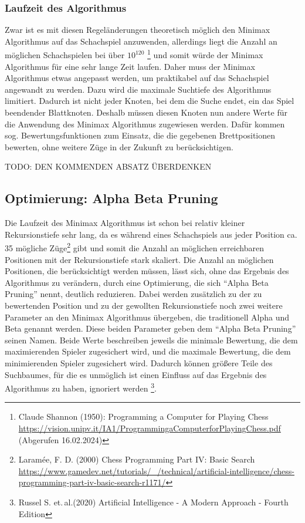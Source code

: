 \documentclass[12pt, a4paper, oneside, openright]{article}
\newcommand \sog{sog.\xspace }
\newcommand \ca{ca.\xspace }
\newcommand \etal{et.\,al.\xspace }
\begin{document}
\subsubsection{Laufzeit des Algorithmus}
Zwar ist es mit diesen Regeländerungen theoretisch möglich den Minimax Algorithmus auf das Schachspiel anzuwenden, allerdings liegt die Anzahl an möglichen Schachspielen bei  über $ 10^{120} $ \footnote{Claude Shannon (1950): Programming a Computer for Playing Chess \url{https://vision.unipv.it/IA1/ProgrammingaComputerforPlayingChess.pdf} (Abgerufen 16.02.2024)} und somit würde der Minimax Algorithmus für eine sehr lange Zeit laufen.
Daher muss der Minimax Algorithmus etwas angepasst werden, um praktikabel auf das Schachspiel angewandt zu werden.
Dazu wird die maximale Suchtiefe des Algorithmus limitiert.
Dadurch ist nicht jeder Knoten, bei dem die Suche endet, ein das Spiel beendender Blattknoten.
Deshalb müssen diesen Knoten nun andere Werte für die Anwendung des Minimax Algorithmus zugewiesen werden.
Dafür kommen \sog Bewertungsfunktionen zum Einsatz, die die gegebenen Brettpositionen bewerten, ohne weitere Züge in der Zukunft zu berücksichtigen\footnotemark[3].

TODO: DEN KOMMENDEN ABSATZ ÜBERDENKEN
\subsection{Optimierung: Alpha Beta Pruning}\label{subsec:optimierung:-alpha-beta-pruning}
Die Laufzeit des Minimax Algorithmus ist schon bei relativ kleiner Rekursionstiefe sehr lang, da es während eines Schachspiels aus jeder Position \ca 35 mögliche Züge\footnote{Laramée, F. D. (2000)  Chess Programming Part IV: Basic Search \url{https://www.gamedev.net/tutorials/_/technical/artificial-intelligence/chess-programming-part-iv-basic-search-r1171/}} gibt und somit die Anzahl an möglichen erreichbaren Positionen mit der Rekursionstiefe stark skaliert.
Die Anzahl an möglichen Positionen, die berücksichtigt werden müssen, lässt sich, ohne das Ergebnis des Algorithmus zu verändern, durch eine Optimierung, die sich \enquote{Alpha Beta Pruning} nennt, deutlich reduzieren.
Dabei werden zusätzlich zu der zu bewertenden Position und zu der gewollten Rekursionstiefe noch zwei weitere Parameter an den Minimax Algorithmus übergeben, die traditionell Alpha und Beta genannt werden.
Diese beiden Parameter geben dem \enquote{Alpha Beta Pruning} seinen Namen.
Beide Werte beschreiben jeweils die minimale Bewertung, die dem maximierenden Spieler zugesichert wird, und die maximale Bewertung, die dem minimierenden Spieler zugesichert wird.
Dadurch können größere Teile des Suchbaumes, für die es unmöglich ist einen Einfluss auf das Ergebnis des Algorithmus zu haben, ignoriert werden \footnote{Russel S. \etal (2020) Artificial Intelligence - A Modern Approach - Fourth Edition}.
\end{document}
